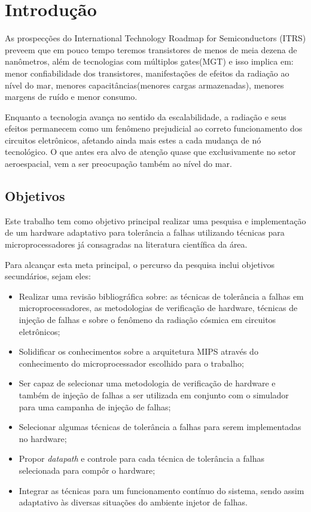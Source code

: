 \chapter{Introdução}
As prospecções do International Technology Roadmap for Semiconductors (ITRS) preveem que em pouco tempo teremos transistores de menos de meia dezena de nanômetros, além de tecnologias com múltiplos gates(MGT) e isso implica em: menor confiabilidade dos transistores, manifestações de efeitos da radiação ao nível do mar, menores capacitâncias(menores cargas armazenadas), menores margens de ruído e menor consumo.\cite{Massengill2012}

Enquanto a tecnologia avança no sentido da escalabilidade, a radiação e seus efeitos permanecem como um fenômeno prejudicial ao correto funcionamento dos circuitos eletrônicos, afetando ainda mais estes a cada mudança de nó tecnológico. O que antes era alvo de atenção quase que exclusivamente no setor aeroespacial, vem a ser preocupação também ao nível do mar.\cite{Massengill2012}

\section{Objetivos}
Este trabalho tem como objetivo principal realizar uma pesquisa e implementação de um hardware adaptativo para tolerância a falhas utilizando técnicas para microprocessadores já consagradas na literatura científica da área.

Para alcançar esta meta principal, o percurso da pesquisa inclui objetivos secundários, sejam eles: 

\begin{itemize}

\item Realizar uma revisão bibliográfica sobre: as técnicas de tolerância a falhas em microprocessadores, as metodologias de verificação de hardware, técnicas de injeção de falhas e sobre o fenômeno da radiação cósmica em circuitos eletrônicos;
\item Solidificar os conhecimentos sobre a arquitetura MIPS através do conhecimento do microprocessador escolhido para o trabalho;
\item Ser capaz de selecionar uma metodologia de verificação de hardware e também de injeção de falhas a ser utilizada em conjunto com o simulador para uma campanha de injeção de falhas;
\item Selecionar algumas técnicas de tolerância a falhas para serem implementadas no hardware;
\item Propor \textit{datapath} e controle para cada técnica de tolerância a falhas selecionada para compôr o hardware;
\item Integrar as técnicas para um funcionamento contínuo do sistema, sendo assim adaptativo às diversas situações do ambiente injetor de falhas.

\end{itemize}


